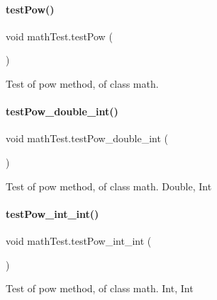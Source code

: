 \paragraph{\texorpdfstring{test\+Pow()}{testPow()}}
{\footnotesize\ttfamily void math\+Test.\+test\+Pow (\begin{DoxyParamCaption}{ }\end{DoxyParamCaption})\hspace{0.3cm}{\ttfamily [inline]}}

Test of pow method, of class math. \mbox{\label{classmathTest_aee6435f28eae194e7d9a8570f62575ca}} 
\paragraph{\texorpdfstring{test\+Pow\+\_\+double\+\_\+int()}{testPow\_double\_int()}}
{\footnotesize\ttfamily void math\+Test.\+test\+Pow\+\_\+double\+\_\+int (\begin{DoxyParamCaption}{ }\end{DoxyParamCaption})\hspace{0.3cm}{\ttfamily [inline]}}

Test of pow method, of class math. Double, Int \mbox{\label{classmathTest_a48eac360a196ee3d36424e5628225145}} 
\paragraph{\texorpdfstring{test\+Pow\+\_\+int\+\_\+int()}{testPow\_int\_int()}}
{\footnotesize\ttfamily void math\+Test.\+test\+Pow\+\_\+int\+\_\+int (\begin{DoxyParamCaption}{ }\end{DoxyParamCaption})\hspace{0.3cm}{\ttfamily [inline]}}

Test of pow method, of class math. Int, Int \mbox{\label{classmathTest_afb4b3d0809188a73c874f8a19a08490a}} 
